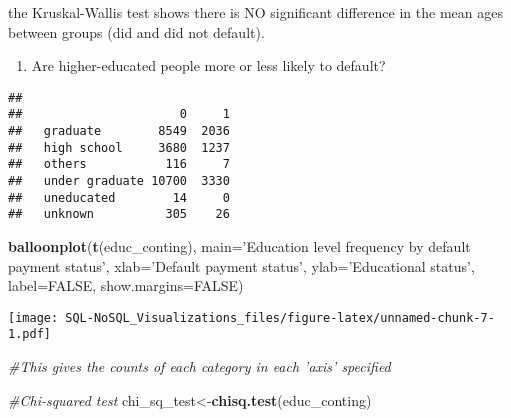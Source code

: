\documentclass[]{article}
\newenvironment{Shaded}{\begin{snugshade}}{\end{snugshade}}
\newcommand{\KeywordTok}[1]{\textcolor[rgb]{0.13,0.29,0.53}{\textbf{#1}}}
\newcommand{\DataTypeTok}[1]{\textcolor[rgb]{0.13,0.29,0.53}{#1}}
\newcommand{\StringTok}[1]{\textcolor[rgb]{0.31,0.60,0.02}{#1}}
\newcommand{\CommentTok}[1]{\textcolor[rgb]{0.56,0.35,0.01}{\textit{#1}}}
\newcommand{\OtherTok}[1]{\textcolor[rgb]{0.56,0.35,0.01}{#1}}
\newcommand{\OperatorTok}[1]{\textcolor[rgb]{0.81,0.36,0.00}{\textbf{#1}}}
\newcommand{\NormalTok}[1]{#1}
\providecommand{\tightlist}{%
  \setlength{\itemsep}{0pt}\setlength{\parskip}{0pt}}
\begin{document}
the Kruskal-Wallis test shows there is NO significant difference in the
mean ages between groups (did and did not default).

\begin{enumerate}
\def\labelenumi{\arabic{enumi}.}
\setcounter{enumi}{1}
\tightlist
\item
  Are higher-educated people more or less likely to default?
\end{enumerate}

\begin{Shaded}
\end{Shaded}

\begin{verbatim}
##                 
##                      0     1
##   graduate        8549  2036
##   high school     3680  1237
##   others           116     7
##   under graduate 10700  3330
##   uneducated        14     0
##   unknown          305    26
\end{verbatim}

\begin{Shaded}
\begin{Highlighting}[]
\KeywordTok{balloonplot}\NormalTok{(}\KeywordTok{t}\NormalTok{(educ_conting), }\DataTypeTok{main=}\StringTok{'Education level frequency by default payment status'}\NormalTok{, }\DataTypeTok{xlab=}\StringTok{'Default payment status'}\NormalTok{, }\DataTypeTok{ylab=}\StringTok{'Educational status'}\NormalTok{, }\DataTypeTok{label=}\OtherTok{FALSE}\NormalTok{, }\DataTypeTok{show.margins=}\OtherTok{FALSE}\NormalTok{)}
\end{Highlighting}
\end{Shaded}

\texttt{[image: SQL-NoSQL\_Visualizations\_files/figure-latex/unnamed-chunk-7-1.pdf]}

\begin{Shaded}
\begin{Highlighting}[]
\CommentTok{#This gives the counts of each category in each 'axis' specified}

\CommentTok{#Chi-squared test}
\NormalTok{chi_sq_test<-}\KeywordTok{chisq.test}\NormalTok{(educ_conting)}
\end{Highlighting}
\end{Shaded}
\end{document}
